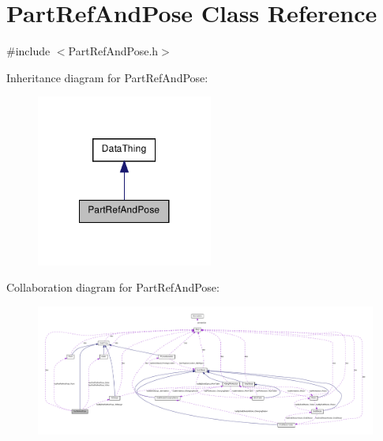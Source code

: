 \hypertarget{class_part_ref_and_pose}{
\section{PartRefAndPose Class Reference}
\label{class_part_ref_and_pose}
}


{\ttfamily \#include $<$PartRefAndPose.h$>$}



Inheritance diagram for PartRefAndPose:\nopagebreak
\begin{figure}[H]
\begin{center}
\leavevmode
\includegraphics[width=164pt]{class_part_ref_and_pose__inherit__graph}
\end{center}
\end{figure}


Collaboration diagram for PartRefAndPose:\nopagebreak
\begin{figure}[H]
\begin{center}
\leavevmode
\includegraphics[width=400pt]{class_part_ref_and_pose__coll__graph}
\end{center}
\end{figure}
